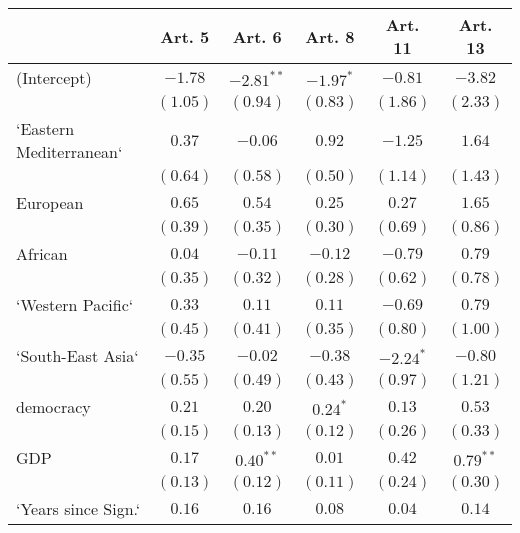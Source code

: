
\begin{table}[!h]
\begin{center}
\begin{tabular}{l c c c c c }
\toprule
 & Art. 5 & Art. 6 & Art. 8 & Art. 11 & Art. 13 \\
\midrule
(Intercept)             & $-1.78$      & $-2.81^{**}$ & $-1.97^{*}$  & $-0.81$      & $-3.82$      \\
                        & $(1.05)$     & $(0.94)$     & $(0.83)$     & $(1.86)$     & $(2.33)$     \\
`Eastern Mediterranean` & $0.37$       & $-0.06$      & $0.92$       & $-1.25$      & $1.64$       \\
                        & $(0.64)$     & $(0.58)$     & $(0.50)$     & $(1.14)$     & $(1.43)$     \\
European                & $0.65$       & $0.54$       & $0.25$       & $0.27$       & $1.65$       \\
                        & $(0.39)$     & $(0.35)$     & $(0.30)$     & $(0.69)$     & $(0.86)$     \\
African                 & $0.04$       & $-0.11$      & $-0.12$      & $-0.79$      & $0.79$       \\
                        & $(0.35)$     & $(0.32)$     & $(0.28)$     & $(0.62)$     & $(0.78)$     \\
`Western Pacific`       & $0.33$       & $0.11$       & $0.11$       & $-0.69$      & $0.79$       \\
                        & $(0.45)$     & $(0.41)$     & $(0.35)$     & $(0.80)$     & $(1.00)$     \\
`South-East Asia`       & $-0.35$      & $-0.02$      & $-0.38$      & $-2.24^{*}$  & $-0.80$      \\
                        & $(0.55)$     & $(0.49)$     & $(0.43)$     & $(0.97)$     & $(1.21)$     \\
democracy               & $0.21$       & $0.20$       & $0.24^{*}$   & $0.13$       & $0.53$       \\
                        & $(0.15)$     & $(0.13)$     & $(0.12)$     & $(0.26)$     & $(0.33)$     \\
GDP                     & $0.17$       & $0.40^{**}$  & $0.01$       & $0.42$       & $0.79^{**}$  \\
                        & $(0.13)$     & $(0.12)$     & $(0.11)$     & $(0.24)$     & $(0.30)$     \\
`Years since Sign.`     & $0.16$       & $0.16$       & $0.08$       & $0.04$       & $0.14$       \\

\end{tabular}
\end{center}
\end{table}

